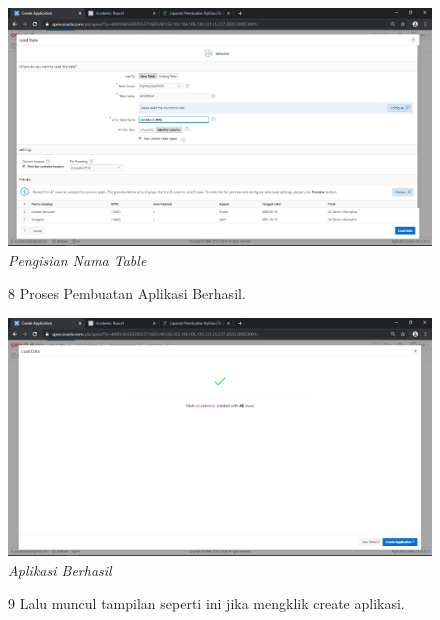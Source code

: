 \begin{enumerate}
\begin{figure}
    \begin{center}
\includegraphics[scale=0.2]{figures/7.png}
    \caption{\textit{Pengisian Nama Table}}
        \end{center}
\label{gambar}
\end{figure}

\begin{figure}
\item[8] Proses Pembuatan Aplikasi Berhasil.

    \begin{center}
\includegraphics[scale=0.2]{figures/8.png}
    \caption{\textit{Aplikasi Berhasil}}
        \end{center}
\label{gambar}
\end{figure}

\begin{figure}
\item[9] Lalu muncul tampilan seperti ini jika mengklik create aplikasi.


\end{figure}
\end{enumerate}
